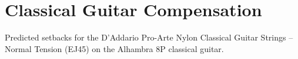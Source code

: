 %
%
%

 \section{Classical Guitar Compensation\label{sct:comp}}

 \begin{table}[htbp]
  \centering
  \caption{\label{tbl:ej45_setbacks} Predicted setbacks for the D'Addario Pro-Arte Nylon Classical Guitar Strings -- Normal Tension (EJ45) on the Alhambra 8P classical guitar.}
  
 \end{table}%

